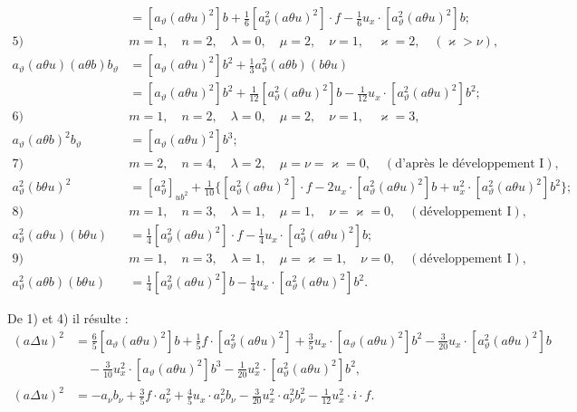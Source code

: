 \documentclass[11pt]{article}
\begin{document}
\begin{align*}
&=[a_\vartheta(a\theta u)^2]b+\frac16[a_\vartheta^2(a\theta u)^2]\cdot f-\frac16u_x\cdot[a_\vartheta^2(a\theta u)^2]b;\\[.6em]
\text{5)}\quad&m=1,\quad n=2,\quad \lambda=0,\quad \mu=2,\quad \nu=1,\quad \varkappa=2,\quad(\varkappa>\nu),\\
a_\vartheta(a\theta u)(a\theta b)b_\vartheta
&=[a_\vartheta(a\theta u)^2]b^2+\frac13a_\vartheta^2(a\theta b)(b\theta u)\\
&=[a_\vartheta(a\theta u)^2]b^2+\frac1{12}[a_\vartheta^2(a\theta u)^2]b-\frac1{12}u_x\cdot[a_\vartheta^2(a\theta u)^2]b^2;\\[.6em]
\text{6)}\quad&m=1,\quad n=2,\quad \lambda=0,\quad \mu=2,\quad \nu=1,\quad \varkappa=3,\\
a_\vartheta(a\theta b)^2b_\vartheta&=[a_\vartheta(a\theta u)^2]b^3;\\[.6em]
\text{7)}\quad&m=2,\quad n=4,\quad \lambda=2,\quad \mu=\nu=\varkappa=0,\quad (\text{d'après le développement I}),\\
a_\vartheta^2(b\theta u)^2&=[a_\vartheta^2]_{ub^2}+\frac1{10}\{[a_\vartheta^2(a\theta u)^2]\cdot f-2u_x\cdot[a_\vartheta^2(a\theta u)^2]b+u_x^2\cdot[a_\vartheta^2(a\theta u)^2]b^2\};\\[.6em]
\text{8)}\quad&m=1,\quad n=3,\quad \lambda=1,\quad \mu=1,\quad \nu=\varkappa=0,\quad (\text{développement I}),\\
a_\vartheta^2(a\theta u)(b\theta u)&=\frac14[a_\vartheta^2(a\theta u)^2]\cdot f-\frac14u_x\cdot[a_\vartheta^2(a\theta u)^2]b;\\[.6em]
\text{9)}\quad&m=1,\quad n=3,\quad \lambda=1,\quad \mu=\varkappa=1,\quad \nu=0,\quad (\text{développement I}),\\
a_\vartheta^2(a\theta b)(b\theta u)&=\frac14[a_\vartheta^2(a\theta u)^2]b-\frac14u_x\cdot[a_\vartheta^2(a\theta u)^2]b^2.
\end{align*}

De 1) et 4) il résulte :
\[
\begin{aligned}
(a\Delta u)^2
&=\frac65[a_\vartheta(a\theta u)^2]b+\frac15f\cdot[a_\vartheta^2(a\theta u)^2]+\frac35u_x\cdot[a_\vartheta(a\theta u)^2]b^2-\frac3{20}u_x\cdot[a_\vartheta^2(a\theta u)^2]b\\
&\quad-\frac3{10}u_x^2\cdot[a_\vartheta(a\theta u)^2]b^3-\frac1{20}u_x^2\cdot[a_\vartheta^2(a\theta u)^2]b^2,\\
(a\Delta u)^2
&=-a_\nu b_\nu+\frac35f\cdot a_\nu^2+\frac45u_x\cdot a_\nu^2b_\nu-\frac3{20}u_x^2\cdot a_\nu^2b_\nu^2-\frac1{12}u_x^2\cdot i\cdot f.
\end{aligned}
\]
\end{document}
